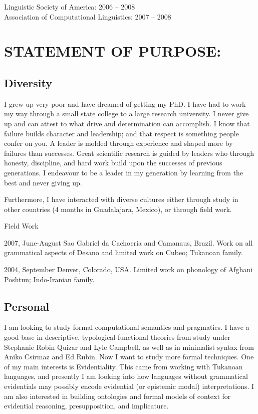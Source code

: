\documentclass[11pt]{article}
\begin{document}
\noindent Linguistic Society of America: 2006 -- 2008\\
Association of Computational Linguistics: 2007 -- 2008\\

\section{STATEMENT OF PURPOSE:} 

\subsection{Diversity}
I grew up very poor and have dreamed of getting my PhD. I have had to work my way through a small state college to a large research university. I never give up and can attest to what drive and determination can accomplish. I know that failure builds character and leadership; and that respect is something people confer on you. A leader is molded through experience and shaped more by failures than successes. Great scientific research is guided by leaders who through honesty, discipline, and hard work build upon the successes of previous generations. I endeavour to be a leader in my generation by learning from the best and never giving up.

Furthermore, I have interacted with diverse cultures either through study in other countries (4 months in Guadalajara, Mexico), or through field work.

\begin{cvlist}{Field Work}
\item[2007, June-August] Sao Gabriel da Cachoeria and Camanaus, Brazil. Work on all grammatical aspects of Desano and limited work on Cubeo; Tukanoan family. 
\item[2004, September] Denver, Colorado, USA. Limited work on phonology of Afghani Poshtun; Indo-Iranian family.
\end{cvlist}

\subsection{Personal}
I am looking to study formal-computational semantics and pragmatics. I have a good base in descriptive, typological-functional theories from study under Stephanie Robin Quizar and Lyle Campbell, as well as in minimalist syntax from Aniko Csirmaz and Ed Rubin. Now I want to study more formal techniques. One of my main interests is Evidentiality. This came from working with Tukanoan languages, and presently I am looking into how languages without grammatical evidentials may possibly encode evidential (or epistemic modal) interpretations. I am also interested in building ontologies and formal models of context for evidential reasoning, presupposition, and implicature. 
\end{document}
